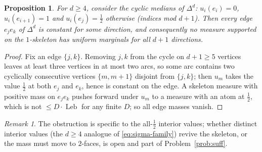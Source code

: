 \documentclass{aims}
\numberwithin{equation}{section}
\theoremstyle{plain}
\newtheorem{proposition}[theorem]{Proposition}
\theoremstyle{definition}
\theoremstyle{remark}
\newtheorem{remark}[theorem]{Remark}
\newcommand{\Leb}{\operatorname{Leb}}
\begin{document}
\begin{proposition}\label{prop:skelobstruction}
For $d\ge4$, consider the cyclic medians of $\Delta^d$: $u_i(e_i)=0$,
$u_i(e_{i+1})=1$ and $u_i(e_j)=\tfrac12$ otherwise (indices mod $d+1$). Then
\emph{every} edge $e_je_k$ of $\Delta^d$ is constant for some direction, and
consequently no measure supported on the $1$-skeleton has uniform marginals for
all $d+1$ directions.
\end{proposition}

\begin{proof}
Fix an edge $\{j,k\}$. Removing $j,k$ from the cycle on $d+1\ge5$ vertices
leaves at least three vertices in at most two arcs, so some arc contains two
cyclically consecutive vertices $\{m,m+1\}$ disjoint from $\{j,k\}$; then $u_m$
takes the value $\tfrac12$ at both $e_j$ and $e_k$, hence is constant on the
edge. A skeleton measure with positive mass on $e_je_k$ pushes forward under
$u_m$ to a measure with an atom at $\tfrac12$, which is not $\le D\cdot\Leb$ for
any finite $D$; so all edge masses vanish.
\end{proof}

\begin{remark}
The obstruction is specific to the all-$\tfrac12$ interior values; whether
distinct interior values (the $d\ge4$ analogue of
\eqref{eq:sigma-family}) revive the skeleton, or the mass must move to
$2$-faces, is open and part of Problem~\ref{prob:suff}.
\end{remark}
\end{document}

